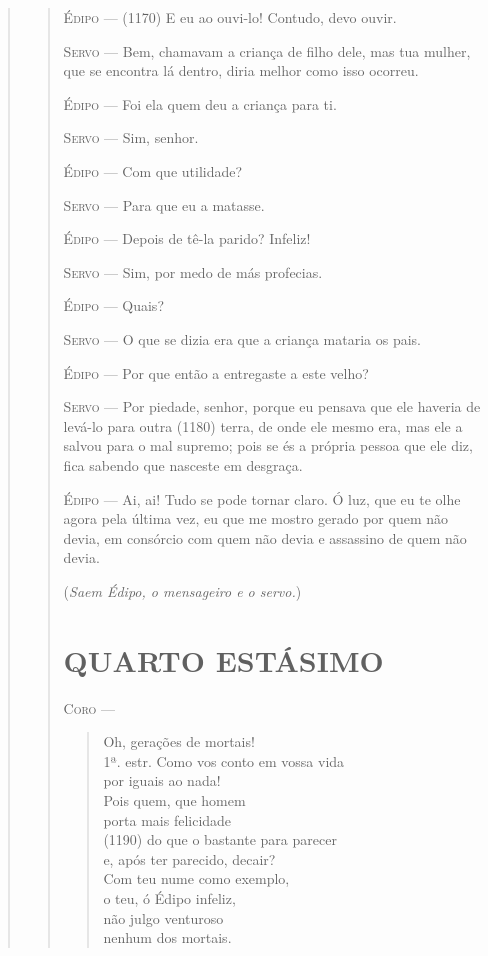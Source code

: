 \begin{verse}
\begin{verse}
\textsc{Édipo} --- (1170) E eu ao ouvi-lo! Contudo, devo ouvir.

\textsc{Servo} --- Bem, chamavam a criança de filho dele, mas tua mulher, que se encontra
lá dentro, diria melhor como isso ocorreu.

\textsc{Édipo} --- Foi ela quem deu a criança para ti.

\textsc{Servo} --- Sim, senhor.

\textsc{Édipo} --- Com que utilidade?

\textsc{Servo} --- Para que eu a matasse.

\textsc{Édipo} --- Depois de tê-la parido? Infeliz!

\textsc{Servo} --- Sim, por medo de más profecias.

\textsc{Édipo} --- Quais?

\textsc{Servo} --- O que se dizia era que a criança mataria os pais.

\textsc{Édipo} --- Por que então a entregaste a este velho?

\textsc{Servo} --- Por piedade, senhor, porque eu pensava que ele haveria de levá-lo para
outra (1180) terra, de onde ele mesmo era, mas ele a salvou para o mal
supremo; pois se és a própria pessoa que ele diz, fica sabendo que
nasceste em desgraça.

\textsc{Édipo} --- Ai, ai! Tudo se pode tornar claro. Ó luz, que eu te olhe agora pela
última vez, eu que me mostro gerado por quem não devia, em consórcio com
quem não devia e assassino de quem não devia.

(\emph{Saem Édipo, o mensageiro e o servo.})

\section{QUARTO ESTÁSIMO}

\textsc{Coro} --- \begin{verse}Oh, gerações de mortais!\\ 1ª. estr.
Como vos conto em vossa vida\\
por iguais ao nada!\\
Pois quem, que homem\\
porta mais felicidade\\ (1190)
do que o bastante para parecer\\
e, após ter parecido, decair?\\
Com teu nume como exemplo,\\
o teu, ó Édipo infeliz,\\
não julgo venturoso\\
nenhum dos mortais.


\end{verse}
\end{verse}
\end{verse}

